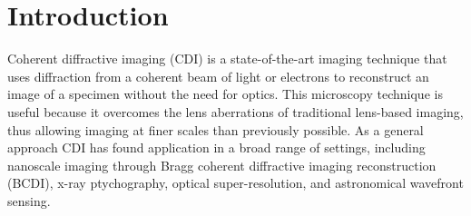 \documentclass[sn-mathphys]{sn-jnl}%
\theoremstyle{thmstyleone}%
\theoremstyle{thmstyletwo}%
\theoremstyle{thmstylethree}%
\begin{document}









\maketitle

\section{Introduction }\label{sec1}
Coherent diffractive imaging (CDI) is a state-of-the-art imaging technique that uses diffraction from a coherent beam of light or electrons to reconstruct an image of a specimen without the need for optics. This microscopy technique is useful because it overcomes the lens aberrations of traditional lens-based imaging, thus allowing imaging at finer scales than previously possible. As a general approach CDI has found application in a broad range of settings, including nanoscale imaging through Bragg coherent diffractive imaging reconstruction (BCDI), x-ray ptychography, optical super-resolution, and astronomical wavefront sensing. \cite{dean2006phase, heintzmann2021answers, miao2015beyond}
\end{document}
